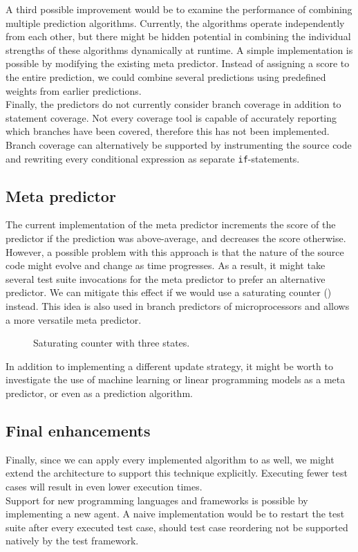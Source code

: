 \noindent A third possible improvement would be to examine the performance of combining multiple prediction algorithms. Currently, the algorithms operate independently from each other, but there might be hidden potential in combining the individual strengths of these algorithms dynamically at runtime. A simple implementation is possible by modifying the existing meta predictor. Instead of assigning a score to the entire prediction, we could combine several predictions using predefined weights from earlier predictions.\\

\noindent Finally, the predictors do not currently consider branch coverage in addition to statement coverage. Not every coverage tool is capable of accurately reporting which branches have been covered, therefore this has not been implemented. Branch coverage can alternatively be supported by instrumenting the source code and rewriting every conditional expression as separate \texttt{if}-statements.

\subsection{Meta predictor}
The current implementation of the meta predictor increments the score of the predictor if the prediction was above-average, and decreases the score otherwise. However, a possible problem with this approach is that the nature of the source code might evolve and change as time progresses. As a result, it might take several test suite invocations for the meta predictor to prefer an alternative predictor. We can mitigate this effect if we would use a saturating counter () instead. This idea is also used in branch predictors of microprocessors and allows a more versatile meta predictor.

\begin{figure}[htbp!]
	\centering
	
	\caption{Saturating counter with three states.}
	\label{fig:saturating-counter}
\end{figure}

\noindent In addition to implementing a different update strategy, it might be worth to investigate the use of machine learning or linear programming models as a meta predictor, or even as a prediction algorithm.

\subsection{Final enhancements}
Finally, since we can apply every implemented algorithm to \tsm{} as well, we might extend the architecture to support this technique explicitly. Executing fewer test cases will result in even lower execution times.\\

\noindent Support for new programming languages and frameworks is possible by implementing a new agent. A naive implementation would be to restart the test suite after every executed test case, should test case reordering not be supported natively by the test framework.